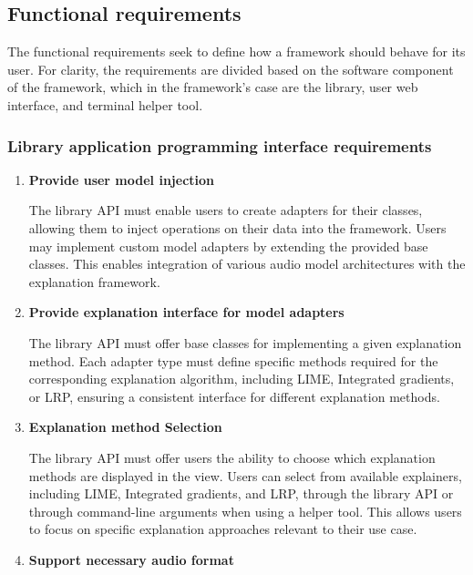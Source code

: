 \documentclass[
    bindingoffset=5mm,  %
    footnoteindent=3mm, %
    hyphenation=true    %
]{src/wut-thesis}
\begin{document}
\subsection{Functional requirements}

    The functional requirements seek to define how a framework should behave for its user.
    For clarity, the requirements are divided based on the software component of the framework,
    which in the framework’s case are the library, user web interface, and terminal helper tool.

\subsubsection{Library application programming interface requirements}
    \begin{enumerate}[itemsep=1\baselineskip]

    \item \textbf{Provide user model injection}

        The library API must enable users to create adapters for their classes, allowing them to
    inject operations on their data into the framework. Users may implement custom model adapters
    by extending the provided base classes. This enables integration of various audio model
    architectures with the explanation framework.

    \item \textbf{Provide explanation interface for model adapters}

        The library API must offer base classes for implementing a given explanation method.
    Each adapter type must define specific methods required for the corresponding explanation algorithm,
    including LIME, Integrated gradients, or LRP, ensuring a consistent interface for different explanation methods.

    \item \textbf{Explanation method Selection}

        The library API must offer users the ability to choose which explanation methods are displayed
    in the view. Users can select from available explainers, including LIME, Integrated gradients,
    and LRP, through the library API or through command-line arguments when using a helper tool.
    This allows users to focus on specific explanation approaches relevant to their use case.

    \item \textbf{Support necessary audio format}


\end{enumerate}
\end{document}
